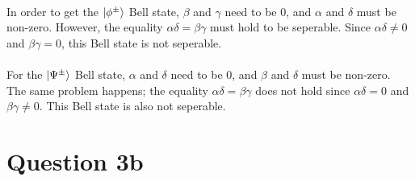 \documentclass{article}
\begin{document}
\paragraph[short]{}{
    In order to get the $\ket{\phi^\pm}$ Bell state, $\beta$ and $\gamma$ need to be 0, and $\alpha$ and $\delta$ must be non-zero. 
    However, the equality $\alpha \delta = \beta \gamma$ must hold to be seperable. Since $\alpha \delta \not= 0$ and $\beta \gamma = 0$, 
    this Bell state is not seperable. \\\\
    For the  $\ket{\Psi^\pm}$ Bell state, $\alpha$ and $\delta$ need to be 0, and $\beta$ and $\delta$ must be non-zero. 
    The same problem happens; the equality $\alpha \delta = \beta \gamma$ does not hold since $\alpha \delta = 0$ and $\beta \gamma \not= 0$. 
    This Bell state is also not seperable.
}

\section*{Question 3b}
\end{document}
